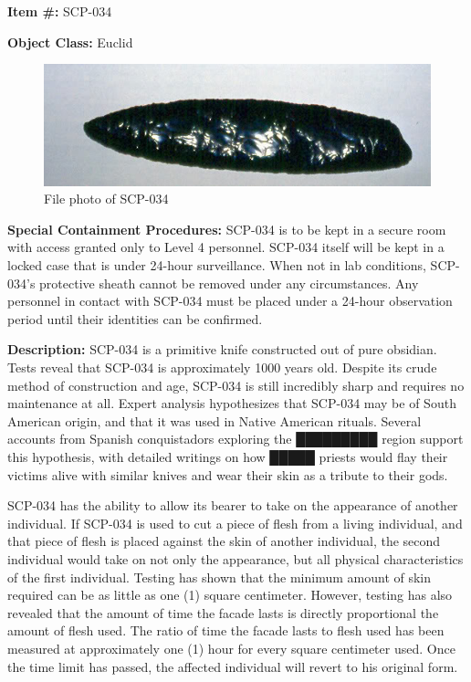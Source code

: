 
\textbf{Item \#:} SCP-034

\textbf{Object Class:} Euclid

\begin{figure}[h]
\begin{center}
\includegraphics[scale=0.4]{scp/034.jpg}
\linebreak File photo of SCP-034
\end{center}
\end{figure}

\textbf{Special Containment Procedures:} SCP-034 is to be kept in a secure room with access granted only to Level 4 personnel. SCP-034 itself will be kept in a locked case that is under 24-hour surveillance. When not in lab conditions, SCP-034's protective sheath cannot be removed under any circumstances. Any personnel in contact with SCP-034 must be placed under a 24-hour observation period until their identities can be confirmed.

\textbf{Description:} SCP-034 is a primitive knife constructed out of pure obsidian. Tests reveal that SCP-034 is approximately 1000 years old. Despite its crude method of construction and age, SCP-034 is still incredibly sharp and requires no maintenance at all. Expert analysis hypothesizes that SCP-034 may be of South American origin, and that it was used in Native American rituals. Several accounts from Spanish conquistadors exploring the █████████ region support this hypothesis, with detailed writings on how █████ priests would flay their victims alive with similar knives and wear their skin as a tribute to their gods.

SCP-034 has the ability to allow its bearer to take on the appearance of another individual. If SCP-034 is used to cut a piece of flesh from a living individual, and that piece of flesh is placed against the skin of another individual, the second individual would take on not only the appearance, but all physical characteristics of the first individual. Testing has shown that the minimum amount of skin required can be as little as one (1) square centimeter. However, testing has also revealed that the amount of time the facade lasts is directly proportional the amount of flesh used. The ratio of time the facade lasts to flesh used has been measured at approximately one (1) hour for every square centimeter used. Once the time limit has passed, the affected individual will revert to his original form.

